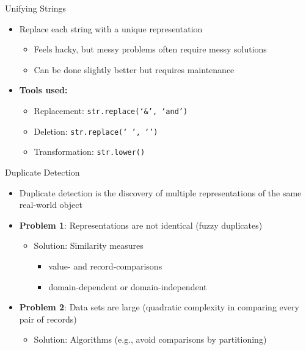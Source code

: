 \documentclass[aspectratio=169]{../latex_main/tntbeamer}  %
\begin{document}
\begin{frame}[c]{Unifying Strings}

\begin{itemize}
    \item Replace each string with a unique representation
    \begin{itemize}
        \item Feels hacky, but messy problems often require messy solutions
        \item Can be done slightly better but requires maintenance
    \end{itemize}
    \item \textbf{Tools used:}
    \begin{itemize}
        \item Replacement: \texttt{str.replace(‘\&’, ‘and’)}
        \item Deletion: \texttt{str.replace(‘ ’, ‘’)}
        \item Transformation: \texttt{str.lower()}
    \end{itemize}
\end{itemize}

\end{frame}

\begin{frame}[c]{Duplicate Detection}

\begin{itemize}
    \item Duplicate detection is the discovery of multiple representations of the same real-world object
    \item \textbf{Problem 1}: Representations are not identical (fuzzy duplicates)
    \begin{itemize}
        \item Solution: Similarity measures 
        \begin{itemize}
            \item value- and record-comparisons
            \item domain-dependent or domain-independent
        \end{itemize}
    \end{itemize}
    \item \textbf{Problem 2}: Data sets are large (quadratic complexity in comparing every pair of records)
    \begin{itemize}
        \item Solution: Algorithms (e.g., avoid comparisons by partitioning)
    \end{itemize}
\end{itemize}

\end{frame}
\end{document}
